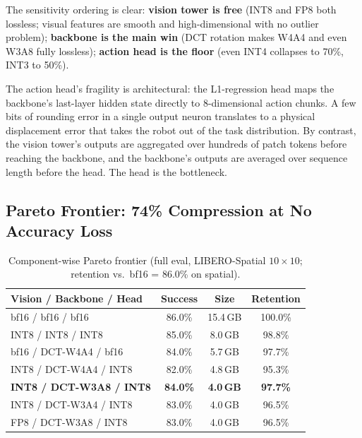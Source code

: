 \documentclass[conference]{IEEEtran}
\begin{document}
The sensitivity ordering is clear: \textbf{vision tower is free} (INT8 and FP8 both
lossless; visual features are smooth and high-dimensional with no outlier problem);
\textbf{backbone is the main win} (DCT rotation makes W4A4 and even W3A8 fully lossless);
\textbf{action head is the floor} (even INT4 collapses to 70\%, INT3 to 50\%).

The action head's fragility is architectural: the L1-regression head maps the backbone's
last-layer hidden state directly to 8-dimensional action chunks. A few bits of rounding
error in a single output neuron translates to a physical displacement error that takes the
robot out of the task distribution. By contrast, the vision tower's outputs are aggregated
over hundreds of patch tokens before reaching the backbone, and the backbone's outputs are
averaged over sequence length before the head. The head is the bottleneck.

\subsection{Pareto Frontier: 74\% Compression at No Accuracy Loss}
\label{sec:pareto}

\begin{table}[h]\centering\small
\caption{Component-wise Pareto frontier (full eval, LIBERO-Spatial $10\times10$;
retention vs.\ bf16 = 86.0\% on spatial).}
\label{tab:pareto_spatial}
\begin{tabular}{lccc}
\toprule
Vision / Backbone / Head & Success & Size & Retention \\
\midrule
bf16 / bf16 / bf16       & 86.0\% & 15.4\,GB & 100.0\% \\
INT8 / INT8 / INT8       & 85.0\% & 8.0\,GB  & 98.8\% \\
bf16 / DCT-W4A4 / bf16  & 84.0\% & 5.7\,GB  & 97.7\% \\
INT8 / DCT-W4A4 / INT8  & 82.0\% & 4.8\,GB  & 95.3\% \\
\textbf{INT8 / DCT-W3A8 / INT8} & \textbf{84.0\%} & \textbf{4.0\,GB} & \textbf{97.7\%} \\
INT8 / DCT-W3A4 / INT8  & 83.0\% & 4.0\,GB  & 96.5\% \\
FP8 / DCT-W3A8 / INT8   & 83.0\% & 4.0\,GB  & 96.5\% \\
\bottomrule
\end{tabular}
\end{table}
\end{document}
